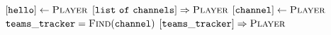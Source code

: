 \documentclass{article}
\begin{document}
\pagestyle{empty}

\newcommand{\send}{\Rightarrow}
\newcommand{\sendto}{\rightarrow}
\algrenewcommand{}

\begin{algorithmic}
  \State $[\mathtt{hello}] \gets \textsc{Player}$
  \State $[\mathtt{list~of~channels}] \send \textsc{Player}$
  \State $[\mathtt{channel}] \gets \textsc{Player}$
  \State $\mathtt{teams\_tracker} = \textsc{Find}(\mathtt{channel})$
  \State $[\mathtt{teams\_tracker}] \send \textsc{Player}$
  \EndWhile
  \EndProcedure
\end{algorithmic}
\end{document}

